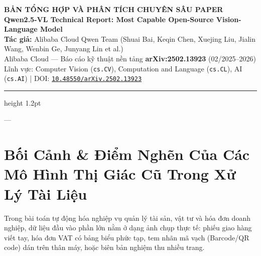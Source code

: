 \documentclass[11pt,a4paper]{article}
\begin{document}
\begin{center}
    {\Large\bfseries BẢN TỔNG HỢP VÀ PHÂN TÍCH CHUYÊN SÂU PAPER}\\[0.3cm]
    {\LARGE\bfseries Qwen2.5-VL Technical Report: Most Capable Open-Source Vision-Language Model}\\[0.4cm]
    {\normalsize\textbf{Tác giả:} Alibaba Cloud Qwen Team (Shuai Bai, Keqin Chen, Xuejing Liu, Jialin Wang, Wenbin Ge, Junyang Lin et al.)}\\[0.15cm]
    {\small Alibaba Cloud — Báo cáo kỹ thuật nền tảng \textbf{arXiv:2502.13923} (02/2025--2026)}\\[0.15cm]
    {\small Lĩnh vực: Computer Vision (\texttt{cs.CV}), Computation and Language (\texttt{cs.CL}), AI (\texttt{cs.AI}) \quad | \quad DOI: \href{https://doi.org/10.48550/arXiv.2502.13923}{\texttt{10.48550/arXiv.2502.13923}}}
\end{center}

\vspace{0.3cm}
\hrule height 1.2pt
\vspace{0.6cm}

---

\section{Bối Cảnh \& Điểm Nghẽn Của Các Mô Hình Thị Giác Cũ Trong Xử Lý Tài Liệu}

Trong bài toán tự động hóa nghiệp vụ quản lý tài sản, vật tư và hóa đơn doanh nghiệp, dữ liệu đầu vào phần lớn nằm ở dạng ảnh chụp thực tế: phiếu giao hàng viết tay, hóa đơn VAT có bảng biểu phức tạp, tem nhãn mã vạch (Barcode/QR code) dán trên thân máy, hoặc biên bản nghiệm thu nhiều trang.
\end{document}
